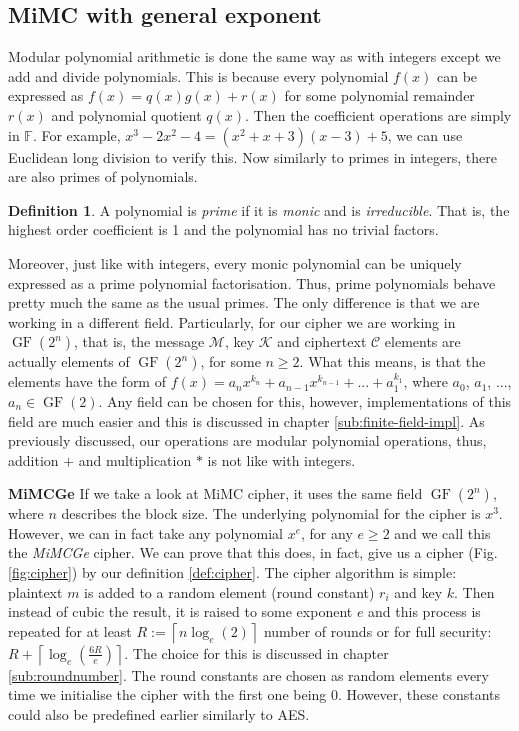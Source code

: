 \documentclass{Resources/UoBLab1}
\theoremstyle{definition}
\newtheorem{definition}[theorem]{Definition}
\begin{document}
\subsection{MiMC with general exponent}\label{sub:mimcge}
Modular polynomial arithmetic is done the same way as with integers except we add and divide polynomials. This is because every polynomial $f(x)$ can be expressed as $f(x) = q(x)g(x) + r(x)$ for some polynomial remainder $r(x)$ and polynomial quotient $q(x)$. Then the coefficient operations are simply in $\mathbb{F}$. For example, \(x^3-2x^2-4 = (x^2+x+3)(x-3) + 5\), we can use Euclidean long division to verify this. Now similarly to primes in integers, there are also primes of polynomials.
\begin{definition}\label{def:prime-poly}
    A polynomial is \textit{prime} if it is \textit{monic} and is \textit{irreducible}. That is, the highest order coefficient is 1 and the polynomial has no trivial factors.
\end{definition}
Moreover, just like with integers, every monic polynomial can be uniquely expressed as a prime polynomial factorisation. Thus, prime polynomials behave pretty much the same as the usual primes. The only difference is that we are working in a different field. Particularly, for our cipher we are working in $\operatorname{GF}(2^n)$, that is, the message $\mathcal{M}$, key $\mathcal{K}$ and ciphertext $\mathcal{C}$ elements are actually elements of $\operatorname{GF}(2^n)$, for some $n \ge 2$. What this means, is that the elements have the form of $f(x) = a_nx^{k_n} + a_{n-1}x^{k_{n-1}} + ... + a_1^{k_1}$, where $a_0$, $a_1$, ..., $a_n \in \operatorname{GF}(2)$. Any field can be chosen for this, however, implementations of this field are much easier and this is discussed in chapter \ref{sub:finite-field-impl}. As previously discussed, our operations are modular polynomial operations, thus, addition $+$ and multiplication $*$ is not like with integers.\medskip

\noindent\textbf{MiMCGe} If we take a look at MiMC cipher\cite{MiMC}, it uses the same field $\operatorname{GF}(2^n)$, where $n$ describes the block size. The underlying polynomial for the cipher is $x^3$. However, we can in fact take any polynomial $x^e$, for any $e \ge 2$ and we call this the \textit{MiMCGe} cipher. We can prove that this does, in fact, give us a cipher (Fig. \ref{fig:cipher}) by our definition \ref{def:cipher}. The cipher algorithm is simple: plaintext $m$ is added to a random element (round constant) $r_i$ and key $k$. Then instead of cubic the result, it is raised to some exponent $e$ and this process is repeated for at least $R := \left\lceil n\log_e(2) \right\rceil$ number of rounds or for full security: \(R + \left\lceil \log_e(\frac{6R}{e}) \right\rceil\). The choice for this is discussed in chapter \ref{sub:roundnumber}. The round constants are chosen as random elements every time we initialise the cipher with the first one being $0$. However, these constants could also be predefined earlier similarly to AES.
\end{document}
